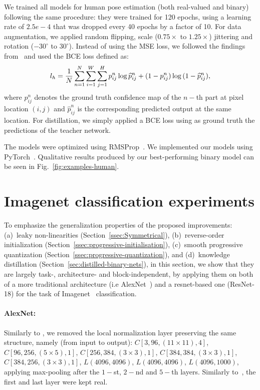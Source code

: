 \documentclass[10pt,twocolumn,letterpaper]{article}
\begin{document}
We trained all models for human pose estimation (both real-valued and binary) following the same procedure: they were trained for 120 epochs, using a learning rate of $2.5e-4$ that was dropped every 40 epochs by a factor of 10. For data augmentation, we applied random flipping, scale ($0.75\times$ to $1.25\times$) jittering and rotation ($-30^{\circ}$ to  $30^{\circ}$). Instead of using the MSE loss, we followed the findings from~\cite{bulat2017binarized} and used the BCE loss defined as:
\begin{equation}
    \small
	l_{h} = \frac{1}{N}\sum_{n=1}^{N}\sum_{i=1}^{W}\sum_{j=1}^{H}p_{ij}^{n}\log{\widehat{p}_{ij}^{n}} + (1 - p_{ij}^{n})\log{(1 - \widehat{p}_{ij}^{n})},
\end{equation}
where $p_{ij}^{n}$ denotes the ground truth confidence map of the $n-$th part at pixel location $(i,j)$ and $\widehat{p}_{ij}^{n}$ is the corresponding predicted output at the same location. For distillation, we simply applied a BCE loss using as ground truth the predictions of the teacher network. 

The models were optimized using RMSProp~\cite{tieleman2012lecture}. We implemented our models using PyTorch~\cite{paszke2017automatic}. Qualitative results produced by our best-performing binary model can be seen in Fig.~\ref{fig:examples-human}.

\section{Imagenet classification experiments}\label{sec:results-imagenet}

To emphasize the generalization properties of the proposed improvements: (a)~leaky non-linearities (Section~\ref{ssec:Symmetrical}), (b)~reverse-order initialization (Section~\ref{ssec:progressive-initialisation}), (c)~smooth progressive quantization (Section~\ref{ssec:progressive-quantization}), and (d)~knowledge distillation (Section~\ref{sec:distilled-binary-nets}), in this section, we show that they are largely task-, architecture- and block-independent, by applying them on both of a more traditional architecture (i.e AlexNet~\cite{krizhevsky2012imagenet}) and a resnet-based one (ResNet-18) for the task of  Imagenet~\cite{deng2009imagenet} classification.

\paragraph{AlexNet:} Similarly to \cite{rastegari2016xnor, courbariaux2016binarized}, we removed the local normalization layer preserving the same structure, namely (from input to output): $C[3,96,(11\times11),4]$, $C[96,256,(5\times5),1]$, $C[256,384,(3\times3),1]$, $C[384,384,(3 \times 3),1]$, $C[384,256,(3\times3),1]$, $L(4096,4096)$, $L(4096,4096)$, $L(4096,1000)$, applying max-pooling after the $1-$st, $2-$nd and $5-$th layers. Similarly to~\cite{rastegari2016xnor}, the first and last layer were kept real.
\end{document}
